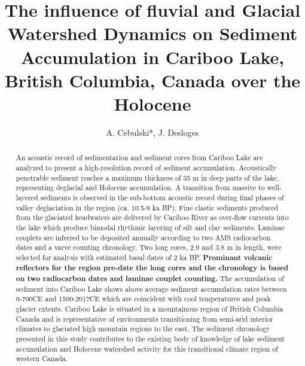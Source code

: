 \documentclass[Royal,times,doublespace,sageh]{sagej}
\begin{document}

\title{The influence of fluvial and Glacial Watershed Dynamics on
Sediment Accumulation in Cariboo Lake, British Columbia, Canada over the
Holocene}


\author{A. Cebulski*, J. Desloges}




\begin{abstract}
An acoustic record of sedimentation and sediment cores from Cariboo Lake
are analyzed to present a high-resolution record of sediment
accumulation. Acoustically penetrable sediment reaches a maximum
thickness of 35 m in deep parts of the lake, representing deglacial and
Holocene accumulation. A transition from massive to well-layered
sediments is observed in the sub-bottom acoustic record during final
phases of valley deglaciation in the region (ca. 10.5-9 ka BP). Fine
clastic sediments produced from the glaciated headwaters are delivered
by Cariboo River as over-flow currents into the lake which produce
bimodal rhythmic layering of silt and clay sediments. Laminae couplets
are inferred to be deposited annually according to two AMS radiocarbon
dates and a varve counting chronology. Two long cores, 2.9 and 3.8 m in
length, were selected for analysis with estimated basal dates of 2 ka
BP. \textbf{Prominant volcanic reflectors for the region pre-date the
long cores and the chronology is based on two radiocarbon dates and
laminae couplet counting.} The accumulation of sediment into Cariboo
Lake shows above average sediment accumulation rates between 0-700CE and
1500-2017CE which are coincident with cool temperatures and peak glacier
extents. Cariboo Lake is situated in a mountainous region of British
Columbia Canada and is representative of environments transitioning from
semi-arid interior climates to glaciated high mountain regions to the
east. The sediment chronology presented in this study contributes to the
existing body of knowledge of lake sediment accumulation and Holocene
watershed activity for this transitional climate region of western
Canada.
\end{abstract}
\end{document}
